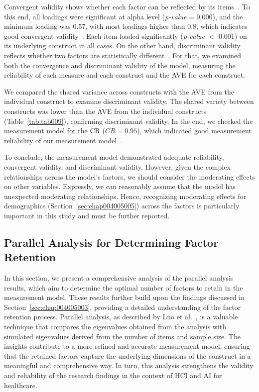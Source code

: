 

Convergent validity shows whether each factor can be reflected by its items~\cite{CALISTO2022102922}.
To this end, all loadings were significant at alpha level ({\it p-value} = 0.000), and the minimum loading was 0.57, with most loadings higher than 0.8, which indicates good convergent validity~\cite{CALISTO2022102922}.
Each item loaded significantly ({\it p-value} $<$ 0.001) on its underlying construct in all cases.
On the other hand, discriminant validity reflects whether two factors are statistically different~\cite{CALISTO2022102922}.
For that, we examined both the convergence and discriminant validity of the model, measuring the reliability of each measure and each construct and the \ac{AVE} for each construct.

We compared the shared variance across constructs with the \ac{AVE} from the individual construct to examine discriminant validity.
The shared variety between constructs was lower than the \ac{AVE} from the individual constructs (Table~\ref{tab:tab009}), confirming discriminant validity.
In the end, we checked the measurement model for the \acl{CR} ($CR = 0.95$), which indicated good measurement reliability of our measurement model~\cite{doi:10.1504/IJMDA.2017.087624, SUMAK2016602}.

To conclude, the measurement model demonstrated adequate reliability, convergent validity, and discriminant validity.
However, given the complex relationships across the model's factors, we should consider the moderating effects on other variables.
Expressly, we can reasonably assume that the model has unexpected moderating relationships.
Hence, recognizing moderating effects for demographics (Section~\ref{sec:chap004005005}) across the factors is particularly important in this study and must be further reported.

\subsection{Parallel Analysis for Determining Factor Retention}
\label{chap:app002004003}

In this section, we present a comprehensive analysis of the parallel analysis results, which aim to determine the optimal number of factors to retain in the measurement model.
These results further build upon the findings discussed in Section~\ref{sec:chap004005003}, providing a detailed understanding of the factor retention process.
Parallel analysis, as described by Luo et al.~\cite{doi:10.1080/10705511.2019.1615835}, is a valuable technique that compares the eigenvalues obtained from the analysis with simulated eigenvalues derived from the number of items and sample size.
The insights contribute to a more refined and accurate measurement model, ensuring that the retained factors capture the underlying dimensions of the construct in a meaningful and comprehensive way.
In turn, this analysis strengthens the validity and reliability of the research findings in the context of \ac{HCI} and \ac{AI} for healthcare.


